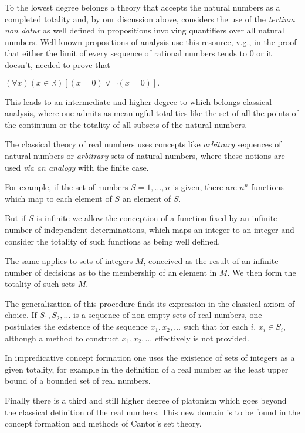 \documentclass[12pt]{article}
\begin{document}
To the lowest degree belongs a theory that accepts the natural numbers as a completed totality and, by our discussion above, considers the use of the \emph{tertium non datur} as well defined in propositions involving quantifiers over all natural numbers. Well known propositions of analysis use this resource, v.g., in the proof that either the limit of every sequence of rational numbers tends to 0 or it doesn't, needed to prove that

\begin{center}
$(\forall x) (x \in \mathbb{R}) [(x = 0) \vee \neg (x = 0)].$
\end{center}

This leads to an intermediate and higher degree to which belongs classical analysis, where one admits as meaningful  totalities like the set of all the points of the continuum or the totality of all subsets of the natural numbers.

The classical theory of real numbers uses concepts like \emph{arbitrary} sequences of natural numbers or \emph{arbitrary} sets of natural numbers, where these notions are used \emph{via an analogy} with the finite case.

For example, if the set of numbers $S = {1, \ldots, n}$ is given, there are $n^n$ functions which map to each element of $S$ an element of $S$.

But if $S$ is infinite we allow the conception of a function fixed by an infinite number of independent determinations, which maps an integer to an integer and consider the totality of such functions as being well defined.

The same applies to sets of integers $M$, conceived as the result of an infinite number of decisions as to the membership of an element in $M$. We then form the totality of such sets $M$.
 
The generalization of this procedure finds its expression in the classical axiom of choice. If $S_1, S_2, \ldots$ is a sequence of non-empty sets of real numbers, one postulates the existence of the sequence $x_1, x_2, \ldots$ such that for each $i$, $x_i \in S_i$, although a method to construct $x_1, x_2, \ldots$ effectively is not provided.

In impredicative concept formation one uses the existence of sets of integers as a given totality, for example in the definition of a real number as the least upper bound of a bounded set of real numbers.

Finally there is a third and still higher degree of platonism which goes beyond the classical definition of the real numbers. This new domain is to be found in the concept formation and methods of Cantor's set theory.
\end{document}
